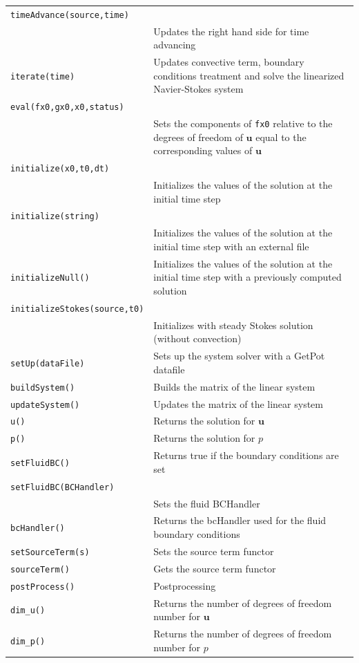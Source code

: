 \documentclass[11pt]{article}
\begin{document}
\begin{center}
\begin{longtable}{p{3cm}p{8cm}}
	\hline
	\texttt{timeAdvance(source,time)} \\
	& Updates the right hand side for time advancing\\
	\texttt{iterate(time)} & Updates convective term, boundary conditions treatment and solve the linearized Navier-Stokes system\\
	\texttt{eval(fx0,gx0,x0,status)} \\
	& Sets the components of \texttt{fx0} relative to the degrees of freedom of $\mathbf{u}$ equal to the corresponding values of $\mathbf{u}$\\
	\texttt{initialize(x0,t0,dt)} \\
	& Initializes the values of the solution at the initial time step\\
	\texttt{initialize(string)} \\
	& Initializes the values of the solution at the initial time step with an external file\\
	\texttt{initializeNull()} & Initializes the values of the solution at the initial time step with a previously computed solution\\
	\texttt{initializeStokes(source,t0)} \\
	& Initializes with steady Stokes solution (without convection)\\
	\texttt{setUp(dataFile)} & Sets up the system solver with a GetPot datafile\\
	\texttt{buildSystem()} & Builds the matrix of the linear system\\
	\texttt{updateSystem()} & Updates the matrix of the linear system\\
	\texttt{u()} & Returns the solution for $\mathbf{u}$\\
	\texttt{p()} & Returns the solution for $p$\\
	\texttt{setFluidBC()} & Returns true if the boundary conditions are set\\
	\texttt{setFluidBC(BCHandler)} \\
	& Sets the fluid BCHandler\\
	\texttt{bcHandler()} & Returns the bcHandler used for the fluid boundary conditions\\
	\texttt{setSourceTerm(s)} & Sets the source term functor\\
	\texttt{sourceTerm()} & Gets the source term functor\\
	\texttt{postProcess()} & Postprocessing\\
	\texttt{dim\_u()} & Returns the number of degrees of freedom number for $\mathbf{u}$\\
	\texttt{dim\_p()} & Returns the number of degrees of freedom number for $p$\\
	\hline
\end{longtable}
\end{center}
\end{document}
